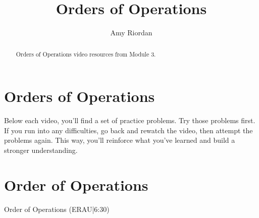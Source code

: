 \documentclass{ximera}
\title{Orders of Operations}
\author{Amy Riordan}
\begin{document}
\begin{abstract}
Orders of Operations video resources from Module 3.
\end{abstract}
\maketitle

\section*{Orders of Operations}

Below each video, you’ll find a set of practice problems. Try those problems first. If you run into any difficulties, go back and rewatch the video, then attempt the problems again. This way, you’ll reinforce what you’ve learned and build a stronger understanding.

\section*{Order of Operations}

Order of Operations (ERAU|6:30)

\end{document}
